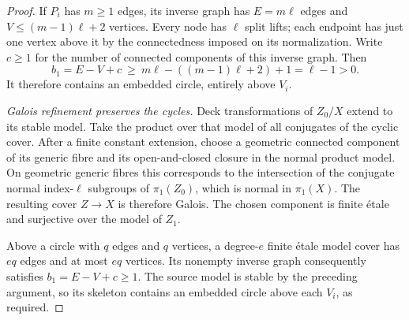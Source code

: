 \begin{proof}
If $P_i$ has $m\ge1$ edges, its inverse graph has $E=m\ell$ edges
and $V\le(m-1)\ell+2$ vertices. Every node has $\ell$ split lifts;
each endpoint has just one vertex above it by the connectedness
imposed on its normalization. Write $c\ge1$ for the number of connected
components of this inverse graph. Then
\[
 b_1=E-V+c\ \ge\ m\ell-((m-1)\ell+2)+1
      =\ell-1>0.
\]
It therefore contains an embedded circle, entirely above $V_i$.

\smallskip\noindent
\emph{Galois refinement preserves the cycles.}
Deck transformations of $Z_0/X$ extend to its stable model. Take the
product over that model of all conjugates of the cyclic cover. After
a finite constant extension, choose a geometric connected component
of its generic fibre and its open-and-closed closure in the normal
product model. On geometric generic fibres this corresponds to the
intersection of the conjugate normal index-$\ell$ subgroups of
$\pi_1(Z_0)$, which is normal in $\pi_1(X)$. The resulting cover
$Z\to X$ is therefore Galois. The chosen component is finite \'etale
and surjective over the model of $Z_1$.

Above a circle with $q$ edges and $q$ vertices, a degree-$e$ finite
\'etale model cover has $eq$ edges and at most $eq$ vertices. Its
nonempty inverse graph consequently satisfies $b_1=E-V+c\ge1$.
The source model is stable by the preceding argument, so its skeleton
contains an embedded circle above each $V_i$, as required.
\end{proof}
